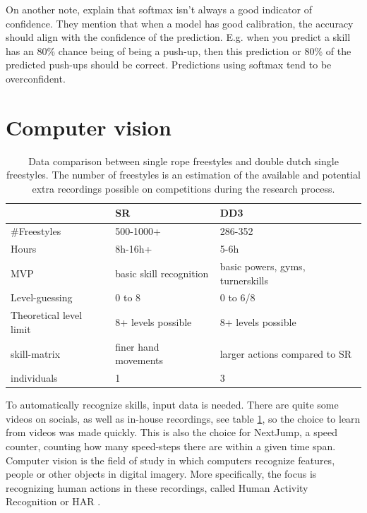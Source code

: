 On another note, \textcite{Guo_2017} explain that softmax isn't always a good indicator of confidence. They mention that when a model has good calibration, the accuracy should align with the confidence of the prediction. E.g. when you predict a skill has an 80\% chance being of being a push-up, then this prediction or 80\% of the predicted push-ups should be correct. Predictions using softmax tend to be overconfident.



\section{Computer vision}
\label{subsec:bp-literature-computer-vision}

\begin{table}[t]
    \centering
    \begin{tabular}{|l|l|l|}
        \hline
        & SR & DD3 \\ \hline
        \#Freestyles & 500-1000+ & 286-352 \\ \hline
        Hours & 8h-16h+ & 5-6h \\ \hline
        MVP & basic skill recognition & basic powers, gyms, turnerskills \\ \hline
        Level-guessing & 0 to 8 & 0 to 6/8 \\ \hline
        Theoretical level limit & 8+ levels possible & 8+ levels possible \\ \hline
        skill-matrix & finer hand movements & larger actions compared to SR \\ \hline
        individuals & 1 & 3 \\ \hline
    \end{tabular}
    \caption[Collected videos data comparison]{Data comparison between single rope freestyles and double dutch single freestyles. The number of freestyles is an estimation of the available and potential extra recordings possible on competitions during the research process.}
    \label{tbl:data-comparison-sr-dd}
\end{table}

To automatically recognize skills, input data is needed. There are quite some videos on socials, as well as in-house recordings, see table \ref{tbl:data-comparison-sr-dd}, so the choice to learn from videos was made quickly. This is also the choice for NextJump, a speed counter, counting how many speed-steps there are within a given time span.
Computer vision is the field of study in which computers recognize features, people or other objects in digital imagery. More specifically, the focus is recognizing human actions in these recordings, called Human Activity Recognition or HAR \autocite{Pareek_2020}.


